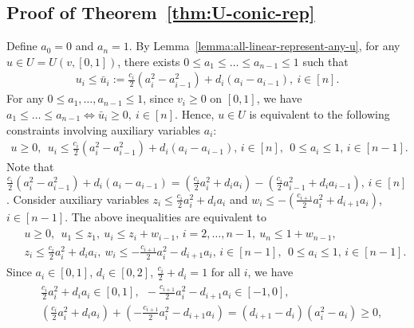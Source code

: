 	\subsection*{Proof of Theorem~\ref{thm:U-conic-rep}}
		Define $a_0 = 0$ and $a_n = 1$. By Lemma~\ref{lemma:all-linear-represent-any-u}, for any $u\in U = U(v, [0,1])$, there exists $0\leq a_1 \leq \dots \leq a_{n-1}\leq 1$ such that 
	\begin{align}
		u_i \leq \bar{u}_i := \frac{c_i}{2}(a_i^2 - a_{i-1}^2) + d_i (a_i - a_{i-1}),\ i\in [n]. 
		\label{eq:u<=a}
	\end{align}
	For any $0\leq a_1, \dots, a_{n-1}\leq 1$, since $v_i \geq 0$ on $[0,1]$, we have 
	$ a_1 \leq \dots \leq a_{n-1} \Leftrightarrow \bar{u}_i \geq 0, \ i\in [n]$.
	Hence, $u\in U$ is equivalent to the following constraints involving auxiliary variables $a_i$:
	\begin{align*}
		u\geq 0, \ \
		u_i \leq \frac{c_i}{2}(a_i^2 - a_{i-1}^2) + d_i (a_i - a_{i-1}),\, i\in [n],\ \
		 0 \leq a_i \leq 1,\, i\in [n-1]. 
	\end{align*}
	Note that $\frac{c_i}{2}(a_i^2 - a_{i-1}^2) + d_i(a_i - a_{i-1}) = \left(\frac{c_i}{2}a_i^2 + d_i a_i\right) - \left(\frac{c_i}{2}a_{i-1}^2 + d_i a_{i-1}\right),\, i\in [n]$.
	Consider auxiliary variables $z_i\leq \frac{c_i}{2}a_i^2 + d_i a_i$ and $w_i \leq - (\frac{c_{i+1}}{2}a_i^2 + d_{i+1} a_i)$, $i\in [n-1]$. The above inequalities are equivalent to 
	\begin{align}
		\begin{split}
			& u\geq 0, \ \ u_1 \leq z_1, \  u_i \leq z_i + w_{i-1},\, i=2, \dots, n-1, \  u_n \leq 1+w_{n-1},\\
			& z_i \leq \frac{c_i}{2} a_i^2 + d_i a_i,\ w_i \leq -\frac{c_{i+1}}{2} a_i^2 - d_{i+1}a_i, \, i \in [n-1], \ \ 0\leq a_i \leq 1,\, i\in [n-1]. 
		\end{split}\label{eq:rep-U-u,z,w,a}
	\end{align}
	Since $a_i \in [0,1]$, $d_i \in [0,2]$, $\frac{c_i}{2} + d_i = 1$ for all $i$, we have
	\begin{align}
		\begin{split}
			& \frac{c_i}{2}a_i^2 + d_i a_i \in [0,1],\ \ -\frac{c_{i+1}}{2}a_i^2 - d_{i+1} a_i \in [-1,0],\\
			& \left(\frac{c_i}{2}a_i^2 + d_i a_i \right) + \left(-\frac{c_{i+1}}{2}a_i^2 - d_{i+1} a_i\right) = (d_{i+1} - d_i)(a_i^2 - a_i) \geq 0, 
		\end{split} \label{eq:range-quad-expr-a}
	\end{align}
